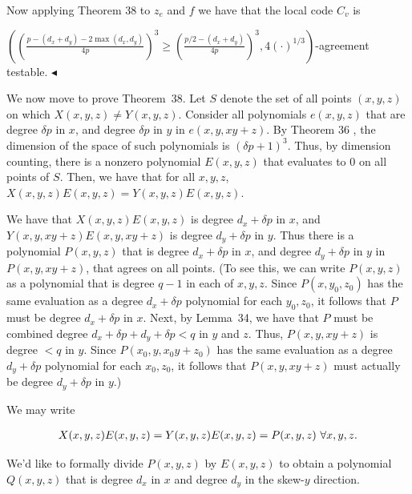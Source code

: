 Now applying Theorem 38 to $z_{e}$ and $f$ we have that the local code $C_{v}$ is


$\left(\left(\frac{p-(d_{x}+d_{y})-2\max(d_{x},d_{y})}{4p}\right)^{3}\geq\left(\frac{p/2-(d_{x}+d_{y})}{4p}\right)^{3},4(\cdot)^{1/3}\right)$-agreement testable.
$\blacktriangleleft$\par




We now move to prove Theorem 38.
Let $S$ denote the set of all points $(x,y,z)$ on which $X(x,y,z)\not=Y(x,y,z)$. Consider all polynomials $e(x,y,z)$ that are degree $\delta p$ in $x$, and degree $\delta p$ in $y$ in $e(x,y,xy+z)$. By Theorem 36 , the dimension of the space of such polynomials is $(\delta p+1)^{3}$. Thus, by dimension counting, there is a nonzero polynomial $E(x,y,z)$ that evaluates to $0$ on all points of $S$. Then, we have that for all $x,y,z$, $X(x,y,z)E(x,y,z)=Y(x,y,z)E(x,y,z)$.\par




We have that $X(x,y,z)E(x,y,z)$ is degree $d_{x}+\delta p$ in $x$, and $Y(x,y,xy+z)E(x,y,xy+z)$ is degree $d_{y}+\delta p$ in $y$. Thus there is a polynomial $P(x,y,z)$ that is degree $d_{x}+\delta p$ in $x$, and degree $d_{y}+\delta p$ in $y$ in $P(x,y,xy+z)$, that agrees on all points. (To see this, we can write $P(x,y,z)$ as a polynomial that is degree $q-1$ in each of $x,y,z$. Since $P(x,y_{0},z_{0})$ has the same evaluation as a degree $d_{x}+\delta p$ polynomial for each $y_{0},z_{0}$, it follows that $P$ must be degree $d_{x}+\delta p$ in $x$. Next, by Lemma 34, we have that $P$ must be combined degree $d_{x}+\delta p+d_{y}+\delta p<q$ in $y$ and $z$. Thus, $P(x,y,xy+z)$ is degree $<q$ in $y$. Since $P(x_{0},y,x_{0}y+z_{0})$ has the same evaluation as a degree $d_{y}+\delta p$ polynomial for each $x_{0},z_{0}$, it follows that $P(x,y,xy+z)$ must actually be degree $d_{y}+\delta p$ in $y$.)\par




We may write\par


\[\begin{gathered}
X(x,y,z)E(x,y,z)=Y(x,y,z)E(x,y,z)=P(x,y,z)\nobreak\ \forall x,y,z.
\end{gathered}\]


We’d like to formally divide $P(x,y,z)$ by $E(x,y,z)$ to obtain a polynomial $Q(x,y,z)$ that is degree $d_{x}$ in $x$ and degree $d_{y}$ in the skew-$y$ direction.\par



